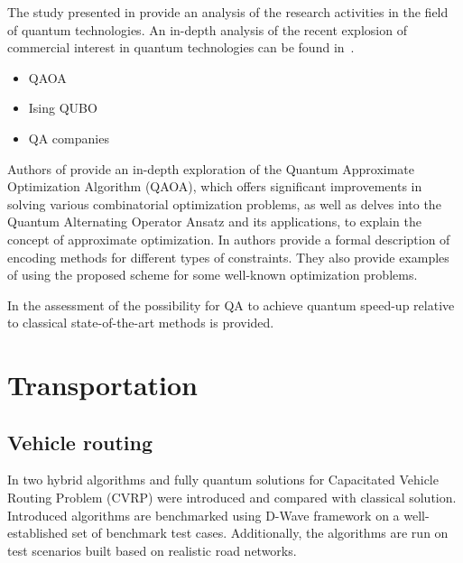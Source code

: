 \documentclass[a4paper,11pt]{article}
\begin{document}
The study presented in \cite{seskir2021landscape} provide an analysis of the research activities in the field of quantum technologies. An in-depth analysis of the recent explosion of commercial interest in quantum technologies can be found in~\cite{seskir2022landscape}.



\begin{itemize}
\item 
QAOA \cite{farhi2014quantum}

\item Ising  \cite{lucas2014ising} QUBO \cite{glover2018tutorial}

\item QA companies \cite{canivell2021startup}

\end{itemize}


Authors of \cite{choi2019tutorial} provide an in-depth exploration of the Quantum Approximate Optimization Algorithm (QAOA), which offers significant improvements in solving various combinatorial optimization problems, as well as delves into the Quantum Alternating Operator Ansatz and its applications,  to explain the concept of approximate optimization. In \cite{ruan2023quantum} authors provide a formal description of encoding methods for different types of constraints. They also provide examples of using the proposed scheme for some well-known optimization problems.

In \cite{crosson2021prospects} the assessment of the possibility for QA to 
achieve quantum speed-up relative to classical state-of-the-art methods is provided.

\newpage 

\section{Transportation}

\subsection{Vehicle routing}

In \cite{borowski2020new} two hybrid algorithms and fully quantum solutions for Capacitated Vehicle Routing Problem (CVRP) were introduced and compared with classical solution. Introduced algorithms are benchmarked using D-Wave framework on a well-established set of benchmark test cases. Additionally, the algorithms are run on test scenarios built based on realistic road networks.
\end{document}
